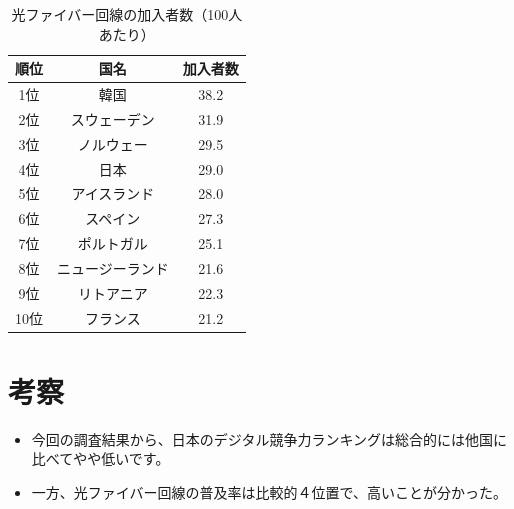\documentclass[a4paper,11pt,dvipdfmx]{ujarticle}
\begin{document}
\begin{table}[htbp]
    \centering
    \caption{光ファイバー回線の加入者数（100人あたり）}
    \label{fig:まみ}

\begin{tabular}{|c|c|c|}\hline
    順位 & 国名 & 加入者数 \\
    \hline
    1位 & 韓国 & 38.2 \\
    \hline
    2位 & スウェーデン & 31.9 \\
    \hline
    3位 & ノルウェー & 29.5 \\
    \hline
    4位 & 日本 & 29.0 \\
    \hline
    5位 & アイスランド & 28.0 \\
    \hline
    6位 & スペイン & 27.3 \\
    \hline
    7位 & ポルトガル & 25.1 \\
    \hline
    8位 & ニュージーランド & 21.6 \\
    \hline
    9位 & リトアニア & 22.3 \\
    \hline
    10位 & フランス & 21.2 \\
    \hline
    \end{tabular}
\end{table}

\maketitle
\section{考察}
\begin{itemize}
    \item 今回の調査結果から、日本のデジタル競争力ランキングは総合的には他国に比べてやや低いです。
    \item 一方、光ファイバー回線の普及率は比較的４位置で、高いことが分かった。
    
\end{itemize}



\end{document}
